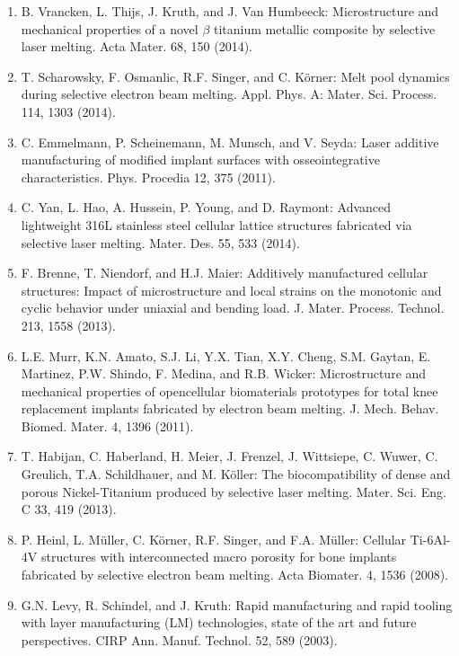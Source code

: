 \documentclass[10pt]{article}
\begin{document}
\begin{enumerate}
  \item B. Vrancken, L. Thijs, J. Kruth, and J. Van Humbeeck: Microstructure and mechanical properties of a novel $\beta$ titanium metallic composite by selective laser melting. Acta Mater. 68, 150 (2014).

  \item T. Scharowsky, F. Osmanlic, R.F. Singer, and C. Körner: Melt pool dynamics during selective electron beam melting. Appl. Phys. A: Mater. Sci. Process. 114, 1303 (2014).

  \item C. Emmelmann, P. Scheinemann, M. Munsch, and V. Seyda: Laser additive manufacturing of modified implant surfaces with osseointegrative characteristics. Phys. Procedia 12, 375 (2011).

  \item C. Yan, L. Hao, A. Hussein, P. Young, and D. Raymont: Advanced lightweight 316L stainless steel cellular lattice structures fabricated via selective laser melting. Mater. Des. 55, 533 (2014).

  \item F. Brenne, T. Niendorf, and H.J. Maier: Additively manufactured cellular structures: Impact of microstructure and local strains on the monotonic and cyclic behavior under uniaxial and bending load. J. Mater. Process. Technol. 213, 1558 (2013).

  \item L.E. Murr, K.N. Amato, S.J. Li, Y.X. Tian, X.Y. Cheng, S.M. Gaytan, E. Martinez, P.W. Shindo, F. Medina, and R.B. Wicker: Microstructure and mechanical properties of opencellular biomaterials prototypes for total knee replacement implants fabricated by electron beam melting. J. Mech. Behav. Biomed. Mater. 4, 1396 (2011).

  \item T. Habijan, C. Haberland, H. Meier, J. Frenzel, J. Wittsiepe, C. Wuwer, C. Greulich, T.A. Schildhauer, and M. Köller: The biocompatibility of dense and porous Nickel-Titanium produced by selective laser melting. Mater. Sci. Eng. C 33, 419 (2013).

  \item P. Heinl, L. Müller, C. Körner, R.F. Singer, and F.A. Müller: Cellular Ti-6Al-4V structures with interconnected macro porosity for bone implants fabricated by selective electron beam melting. Acta Biomater. 4, 1536 (2008).

  \item G.N. Levy, R. Schindel, and J. Kruth: Rapid manufacturing and rapid tooling with layer manufacturing (LM) technologies, state of the art and future perspectives. CIRP Ann. Manuf. Technol. 52, 589 (2003).


\end{enumerate}
\end{document}
